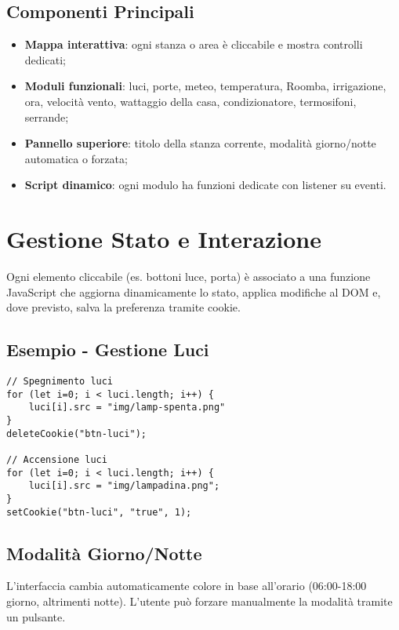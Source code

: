 \documentclass[a4paper,12pt]{article}
\begin{document}
\subsection{Componenti Principali}

\begin{itemize}
  \item \textbf{Mappa interattiva}: ogni stanza o area è cliccabile e mostra controlli dedicati;
  \item \textbf{Moduli funzionali}: luci, porte, meteo, temperatura, Roomba, irrigazione, ora, velocità vento, wattaggio della casa, condizionatore, termosifoni, serrande;
  \item \textbf{Pannello superiore}: titolo della stanza corrente, modalità giorno/notte automatica o forzata;
  \item \textbf{Script dinamico}: ogni modulo ha funzioni dedicate con listener su eventi.
\end{itemize}

\section{Gestione Stato e Interazione}

Ogni elemento cliccabile (es. bottoni luce, porta) è associato a una funzione JavaScript che aggiorna dinamicamente lo stato, applica modifiche al DOM e, dove previsto, salva la preferenza tramite cookie.

\subsection{Esempio - Gestione Luci}

\begin{lstlisting}
// Spegnimento luci
for (let i=0; i < luci.length; i++) {
    luci[i].src = "img/lamp-spenta.png"
}
deleteCookie("btn-luci");

// Accensione luci
for (let i=0; i < luci.length; i++) {
    luci[i].src = "img/lampadina.png";
}
setCookie("btn-luci", "true", 1);
\end{lstlisting}

\subsection{Modalità Giorno/Notte}

L’interfaccia cambia automaticamente colore in base all’orario (06:00-18:00 giorno, altrimenti notte). L’utente può forzare manualmente la modalità tramite un pulsante.
\end{document}

